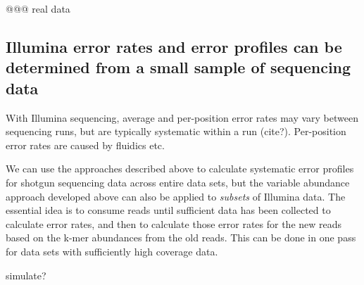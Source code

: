 @@@ real data

\subsection{Illumina error rates and error profiles can be determined from a
small sample of sequencing data}

With Illumina sequencing, average and per-position error rates may
vary between sequencing runs, but are typically systematic within a
run (cite?).  Per-position error rates are caused by fluidics etc.

We can use the approaches described above to calculate systematic
error profiles for shotgun sequencing data across entire data sets, but
the variable abundance approach developed above can also be applied to
{\em subsets} of Illumina data.  The essential idea is to consume
reads until sufficient data has been collected to calculate error
rates, and then to calculate those error rates for the new reads based
on the k-mer abundances from the old reads.  This can be done in
one pass for data sets with sufficiently high coverage data.



simulate?


